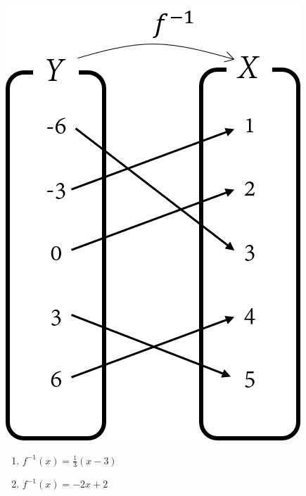 \documentclass{oblivoir}
\begin{document}
\begin{multicols*}{2}
%
\begin{center}
\includegraphics[width=0.4\columnwidth]{inverse_3a}
\end{center}

%

%

%
\begin{enumerate}
\item
\(f^{-1}(x)=\frac13(x-3)\)
\item
\(f^{-1}(x)=-2x+2\)
\end{enumerate}


\end{multicols*}
\end{document}

